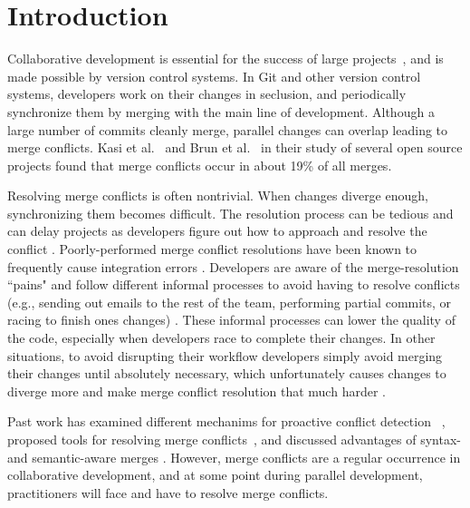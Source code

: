 
\section{Introduction}\label{introduction}


Collaborative development is essential for the success of large projects~\cite{hattori2010syde}, and is made possible by version control systems.
In Git and other version control systems, developers work on their changes in seclusion, and periodically synchronize them by merging with the main line of development. Although a large number of commits cleanly merge, parallel changes can overlap leading to merge conflicts. Kasi et al.~\cite{cassandra} and Brun et al.~\cite{Brun2011} in their study of several open source projects found that merge conflicts occur in about 19\% of all merges.

Resolving merge conflicts is often nontrivial. When changes diverge enough, synchronizing them becomes difficult. The resolution process can be tedious and can delay projects as developers figure out how to approach and resolve the conflict \cite{cassandra}. Poorly-performed merge conflict resolutions have been known to frequently cause integration errors \cite{bird-branches-conflict}. Developers are aware of the merge-resolution ``pains" and follow different informal processes to avoid having to resolve conflicts (e.g., sending out emails to the rest of the team, performing partial commits, or racing to finish ones changes) \cite{cleidison, herbsleb}. These informal processes can lower the quality of the code, especially when developers race to complete their changes. In other situations, to avoid disrupting their workflow developers simply avoid merging their changes until absolutely necessary, which unfortunately causes changes to diverge more and make merge conflict resolution that much harder \cite{Brun2011}. 


Past work has examined different mechanims for proactive conflict detection ~\cite{Brun2011, palantir, Guimaraes}, proposed tools for resolving merge conflicts~\cite{nishimura}\cite{mens2002state}, and discussed advantages of syntax- and semantic-aware merges \cite{danny_refactorings}\cite{hunt2002extensible}. However, merge conflicts are a regular occurrence in collaborative development, and at some point during parallel development, practitioners will face and have to resolve merge conflicts.

